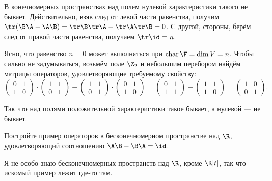 \begin{solution}
    В конечномерных пространствах над полем нулевой характеристики такого не бывает. Действительно, взяв след от левой части равенства, получим $\tr(\B\A - \A\B) = \tr\B\tr\A - \tr\A\tr\B = 0$. С другой, стороны, берём след от правой части равенства, получаем $\tr\id = n$.

    Ясно, что равенство $n = 0$ может выполняться при $\operatorname{char}\F = \dim V = n$. Чтобы сильно не задумываться, возьмём поле $\Z_2$ и небольшим перебором найдём матрицы операторов, удовлетворяющие требуемому свойству:
    \[
        \begin{pmatrix}
            0 & 1\\
            1 & 0
        \end{pmatrix} \cdot
        \begin{pmatrix}
            1 & 1\\
            0 & 1
        \end{pmatrix} -
        \begin{pmatrix}
            1 & 1\\
            0 & 1
        \end{pmatrix} \cdot
        \begin{pmatrix}
            0 & 1\\
            1 & 0
        \end{pmatrix} =
        \begin{pmatrix}
            0 & 1\\
            1 & 1
        \end{pmatrix} -
        \begin{pmatrix}
            1 & 1\\
            1 & 0
        \end{pmatrix} =
        \begin{pmatrix}
            1 & 0\\
            0 & 1
        \end{pmatrix}.
    \]

    Так что над полями положительной характеристики такое бывает, а нулевой --- не бывает.
\end{solution}

\begin{problem}
    Постройте пример операторов в бесконечномерном пространстве над $\R$, удовлетворяющий соотношению $\A\B - \B\A = \id$.
\end{problem}

\begin{solution}
    Я не особо знаю бесконечномерных пространств над $\R$, кроме $\R[t]$, так что искомый пример лежит где-то там.
\end{solution}

